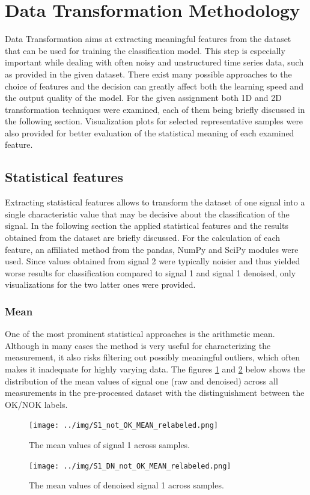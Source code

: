 \documentclass[12pt]{report}
\begin{document}
\section{Data Transformation Methodology}
Data Transformation aims at extracting meaningful features from the dataset that can be used for training the classification model. This step is especially important while dealing with often noisy and unstructured time series data, such as provided in the given dataset. There exist many possible approaches to the choice of features and the decision can greatly affect both the learning speed and the output quality of the model. For the given assignment both 1D and 2D transformation techniques were examined, each of them being briefly discussed in the following section. Visualization plots for selected representative samples were also provided for better evaluation of the statistical meaning of each examined feature.
\subsection{Statistical features}
Extracting statistical features allows to transform the dataset of one signal into a single characteristic value that may be decisive about the classification of the signal. In the following section the applied statistical features and the results obtained from the dataset are briefly discussed. For the calculation of each feature, an affiliated method from the pandas, NumPy and SciPy modules were used. Since values obtained from signal 2 were typically noisier and thus yielded worse results for classification compared to signal 1 and signal 1 denoised, only visualizations for the two latter ones were provided.
\subsubsection{Mean}
One of the most prominent statistical approaches is the arithmetic mean. Although in many cases the method is very useful for characterizing the measurement, it also risks filtering out possibly meaningful outliers, which often makes it inadequate for highly varying data. The figures \ref{fig:S1MEAN} and \ref{fig:S1DNMEAN}  below shows the distribution of the mean values of signal one (raw and denoised) across all measurements in the pre-processed dataset with the distinguishment between the OK/NOK labels.

\begin{figure}[H]
	\centering
	\texttt{[image: ../img/S1\_not\_OK\_MEAN\_relabeled.png]}
	\caption{The mean values of signal 1 across samples.}
	\label{fig:S1MEAN}
\end{figure}
\begin{figure}[H]
	\centering
	\texttt{[image: ../img/S1\_DN\_not\_OK\_MEAN\_relabeled.png]}
	\caption{The mean values of denoised signal 1 across samples.}
	\label{fig:S1DNMEAN}
\end{figure}
\end{document}
